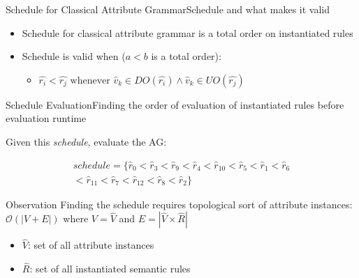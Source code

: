 \begin{frame}{Schedule for Classical Attribute Grammar}{Schedule and what makes it valid}
    \begin{itemize}
        \item Schedule for classical attribute grammar is a \alert{total order on instantiated rules}

        \item Schedule is \alert{valid} when ($a < b$ is a total order):

    \begin{itemize}
        \item $\hat{r_i} < \hat{r_j} \text{  whenever } \hat{v}_k \in \mathit{DO}(\hat{r_i}) \wedge \hat{v}_k \in \mathit{UO}(\hat{r_j})$
    \end{itemize}
    \end{itemize}

\end{frame}



\begin{frame}{Schedule Evaluation}{Finding the order of evaluation of instantiated rules before evaluation runtime}

Given this \emph{schedule}, evaluate the AG:

\begin{equation}
\begin{split}
\mathit{schedule} = \Big \{\hat{r}_0 < \hat{r}_3 < \hat{r}_9 < \hat{r}_4 < \hat{r}_{10} < \hat{r}_5 < \hat{r}_1 < \hat{r}_6 \\
< \hat{r}_{11} < \hat{r}_7 < \hat{r}_{12} < \hat{r}_8 < \hat{r}_2 \Big \}    
\end{split}
\end{equation}

\begin{alertblock}{Observation}
Finding the schedule requires topological sort of attribute instances: $\mathcal{O}(| V +  E|)$ where $V = \hat{V}$ and $E = |\hat{V}  \times  \hat{R}|$
\end{alertblock}

\begin{itemize}
    \item $\hat{V}$: set of all attribute instances
    \item $\hat{R}$: set of all instantiated semantic rules
\end{itemize}
\end{frame}

